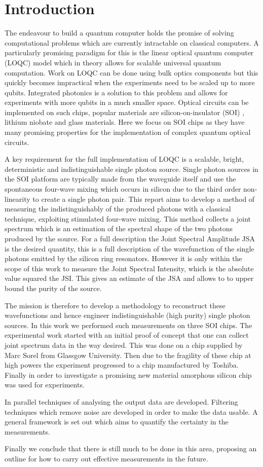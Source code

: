 \newpage
\section{Introduction}
The endeavour to build a quantum computer holds the promise of solving computational problems which are currently intractable on classical computers. A particularly promising paradigm for this is the linear optical quantum computer (LOQC) model which in theory allows for scalable universal quantum computation. Work on LOQC can be done using bulk optics components but this quickly becomes impractical when the experiments need to be scaled up to more qubits. Integrated photonics is a solution to this problem and allows for experiments with more qubits in a much smaller space. Optical circuits can be implemented on such chips, popular materials are silicon-on-insulator (SOI) , lithium niobate and glass materials. Here we focus on SOI chips as they have many promising properties for the implementation of complex quantum optical circuits.

A key requirement for the full implementation of LOQC is a scalable, bright, deterministic and indistinguishable single photon source. Single photon sources in the SOI platform are typically made from the waveguide itself and use the spontaneous four-wave mixing which occurs in silicon due to the third order non-linearity to create a single photon pair. This report aims to develop a method of measuring the indistinguishably of the produced photons with a classical technique, exploiting stimulated four-wave mixing. This method collects a joint spectrum which is an estimation of the spectral shape of the two photons produced by the source. For a full description the Joint Spectral Amplitude JSA is the desired quantity, this is a full description of the wavefunction of the single photons emitted by the silicon ring resonators. However it is only within the scope of this work to measure the Joint Spectral Intensity, which is the absolute value squared the JSI. This gives an estimate of the JSA and allows to to upper bound the purity of the source.

The mission is therefore to develop a methodology to reconstruct these wavefunctions and hence engineer indistinguishable (high purity) single photon sources. In this work we performed such measurements on three SOI chips. The experimental work started with an initial proof of concept that one can collect joint spectrum data in the way desired. This was done on a chip supplied by Marc Sorel from Glassgow University. Then due to the fragility of these chip at high powers the experiment progressed to a chip manufactured by Toshiba. Finally in order to investigate a promising new material amorphous silicon chip was used for experiments. 

In parallel techniques of analysing the output data are developed. Filtering techniques which remove noise are developed in order to make the data usable. A general framework is set out which aims to quantify the certainty in the measurements.

Finally we conclude that there is still much to be done in this area, proposing an outline for how to carry out effective measurements in the future.


